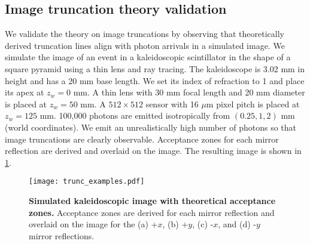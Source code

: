 \subsection{Image truncation theory validation}
We validate the theory on image truncations by observing that theoretically 
derived truncation lines align with photon arrivals in a simulated image.
We simulate the image of an event in a kaleidoscopic scintillator in the shape of 
a square pyramid using a thin lens and ray tracing. 
The kaleidoscope is 3.02 mm in height and has a 20 mm base length.
We set its index of refraction to 1 and place its apex at $z_w=0$ mm.
A thin lens with 30 mm focal length and 20 mm diameter is placed at $z_w=50$ mm.
A $512 \times 512$ sensor with 16 $\mu$m pixel pitch is placed at $z_w=125$ mm.
100,000 photons are emitted isotropically from $(0.25, 1, 2)$ mm (world 
coordinates).
We emit an unrealistically high number of photons so that image truncations are 
clearly observable.
Acceptance zones for each mirror reflection are derived and overlaid on the image.
The resulting image is shown in \cref{fig:trunc_examples}.

\begin{figure}
\centering
\texttt{[image: trunc\_examples.pdf]}
\caption{\textbf{Simulated kaleidoscopic image with theoretical acceptance zones.} 
Acceptance zones are derived for each mirror reflection and overlaid on the image 
for the (a) +$x$, (b) +$y$, (c) -$x$, and (d) -$y$ mirror reflections.} 
\label{fig:trunc_examples}
\end{figure}